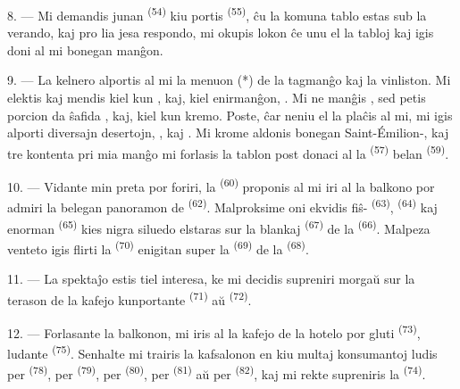 8. --- Mi demandis junan  \textsuperscript{(54)} kiu portis
 \textsuperscript{(55)}, ĉu la komuna tablo estas sub la
verando, kaj pro lia jesa respondo, mi okupis lokon ĉe unu el la tabloj kaj
igis doni al mi bonegan manĝon.


\VUsaut{4.0mm}
\VUsaut{3.0mm}

9. --- La kelnero alportis al mi la menuon (*) de la tagmanĝo kaj la vinliston.
Mi elektis kaj mendis kiel  kun ,
kaj, kiel enirmanĝon, . Mi ne manĝis
, sed petis porcion da ŝafida , kaj, kiel
 kun kremo. Poste, ĉar neniu el la
 plaĉis al mi, mi igis alporti diversajn desertojn,
,  kaj . Mi krome aldonis
bonegan Saint-Émilion-, kaj tre kontenta pri mia manĝo mi
forlasis la tablon post donaci al la  \textsuperscript{(57)}
belan  \textsuperscript{(59)}.

10. --- Vidante min preta por foriri, la 
\textsuperscript{(60)} proponis al mi iri al la balkono por admiri la belegan
panoramon de  \textsuperscript{(62)}. Malproksime oni ekvidis
fiŝ- \textsuperscript{(63)}, 
\textsuperscript{(64)} kaj enorman  \textsuperscript{(65)}
kies nigra siluedo elstaras sur la blankaj 
\textsuperscript{(67)} de la  \textsuperscript{(66)}. Malpeza
venteto igis flirti la  \textsuperscript{(70)} enigitan super
la  \textsuperscript{(69)} de la 
\textsuperscript{(68)}.

\VUsaut{3.0mm}
\VUsaut{3.0mm}

11. --- La spektaĵo estis tiel interesa, ke mi decidis supreniri morgaŭ sur la
terason de la kafejo kunportante  \textsuperscript{(71)} aŭ
 \textsuperscript{(72)}.

12. --- Forlasante la balkonon, mi iris al la kafejo de la hotelo por gluti
 \textsuperscript{(73)}, ludante 
\textsuperscript{(75)}. Senhalte mi trairis la kafsalonon en kiu multaj
konsumantoj ludis per  \textsuperscript{(78)}, per 
\textsuperscript{(79)}, per  \textsuperscript{(80)}, per
 \textsuperscript{(81)} aŭ per 
\textsuperscript{(82)}, kaj mi rekte supreniris la 
\textsuperscript{(74)}.

